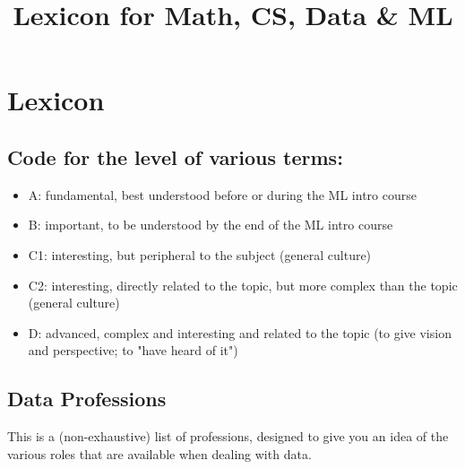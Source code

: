 \documentclass{article}
\title{Lexicon for Math, CS, Data & ML}
\begin{document}
\section*{Lexicon}

\subsection*{Code for the level of various terms:}
\begin{itemize}
    \item A: fundamental, best understood before or during the ML intro course
    \item B: important, to be understood by the end of the ML intro course
    \item C1: interesting, but peripheral to the subject (general culture)
    \item C2: interesting, directly related to the topic, but more complex than the topic (general culture)
    \item D: advanced, complex and interesting and related to the topic (to give vision and perspective; to "have heard of it")
\end{itemize}



\subsection*{Data Professions}

This is a (non-exhaustive) list of professions, designed to give you an idea of the various roles that are available when dealing with data.
\end{document}
